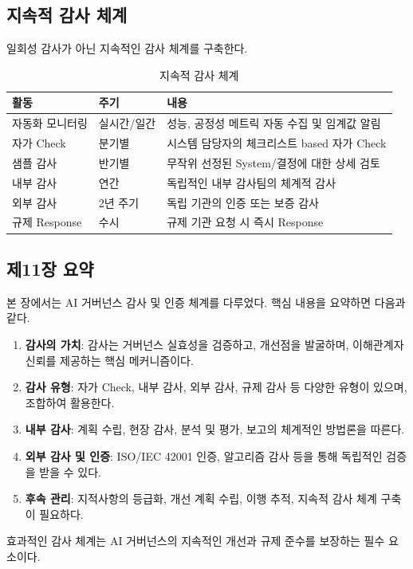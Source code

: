 \subsection{지속적 감사 체계}
\label{sec:11.4.3}

일회성 감사가 아닌 지속적인 감사 체계를 구축한다.

\begin{table}[htbp]
\centering
\caption{지속적 감사 체계}
\label{tab:continuous_audit}
\begin{tabularx}{\textwidth}{p{3cm}p{2.5cm}X}
\toprule
\textbf{활동} & \textbf{주기} & \textbf{내용} \\
\midrule
자동화 모니터링 & 
실시간/일간 & 
성능, 공정성 메트릭 자동 수집 및 임계값 알림 \\
\midrule
자가 Check & 
분기별 & 
시스템 담당자의 체크리스트 based 자가 Check \\
\midrule
샘플 감사 & 
반기별 & 
무작위 선정된 System/결정에 대한 상세 검토 \\
\midrule
내부 감사 & 
연간 & 
독립적인 내부 감사팀의 체계적 감사 \\
\midrule
외부 감사 & 
2년 주기 & 
독립 기관의 인증 또는 보증 감사 \\
\midrule
규제 Response & 
수시 & 
규제 기관 요청 시 즉시 Response \\
\bottomrule
\end{tabularx}
\end{table}


\subsection*{제11장 요약}

본 장에서는 AI 거버넌스 감사 및 인증 체계를 다루었다. 
핵심 내용을 요약하면 다음과 같다.

\begin{enumerate}
 \item \textbf{감사의 가치}: 
 감사는 거버넌스 실효성을 검증하고, 
 개선점을 발굴하며, 이해관계자 신뢰를 제공하는 핵심 메커니즘이다.
 
 \item \textbf{감사 유형}: 
 자가 Check, 내부 감사, 외부 감사, 규제 감사 등 
 다양한 유형이 있으며, 조합하여 활용한다.
 
 \item \textbf{내부 감사}: 
 계획 수립, 현장 감사, 분석 및 평가, 보고의 
 체계적인 방법론을 따른다.
 
 \item \textbf{외부 감사 및 인증}: 
 ISO/IEC 42001 인증, 알고리즘 감사 등을 통해 
 독립적인 검증을 받을 수 있다.
 
 \item \textbf{후속 관리}: 
 지적사항의 등급화, 개선 계획 수립, 이행 추적, 
 지속적 감사 체계 구축이 필요하다.
\end{enumerate}

효과적인 감사 체계는 AI 거버넌스의 지속적인 개선과 
규제 준수를 보장하는 필수 요소이다.
